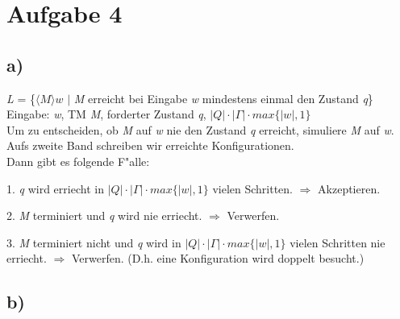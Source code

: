 \documentclass[a4paper,11pt]{scrartcl}
\begin{document}
\section*{Aufgabe 4}
\subsection*{a)}

\textit{L} = \{$\langle M \rangle w$ $|$ \textit{M} erreicht bei Eingabe \textit{w} mindestens einmal den Zustand \textit{q}\}\\

Eingabe: \textit{w}, TM \textit{M}, forderter Zustand \textit{q}, $|Q|\cdot |\Gamma | \cdot max\{ |w|,1 \}$\\

Um zu entscheiden, ob \textit{M} auf \textit{w} nie den Zustand \textit{q} erreicht, simuliere \textit{M} auf \textit{w}. Aufs zweite Band schreiben wir erreichte Konfigurationen.\\

Dann gibt es folgende F"alle:

1. \textit{q} wird erriecht in $|Q|\cdot |\Gamma | \cdot max\{ |w|,1 \}$ vielen Schritten. $\Longrightarrow$ Akzeptieren.

2. \textit{M} terminiert und \textit{q} wird nie erriecht. $\Longrightarrow$ Verwerfen.

3. \textit{M} terminiert nicht und \textit{q} wird in $|Q|\cdot |\Gamma | \cdot max\{ |w|,1 \}$ vielen Schritten nie erriecht. $\Longrightarrow$ Verwerfen. (D.h. eine Konfiguration wird doppelt besucht.)


\subsection*{b)}











	
\end{document}
